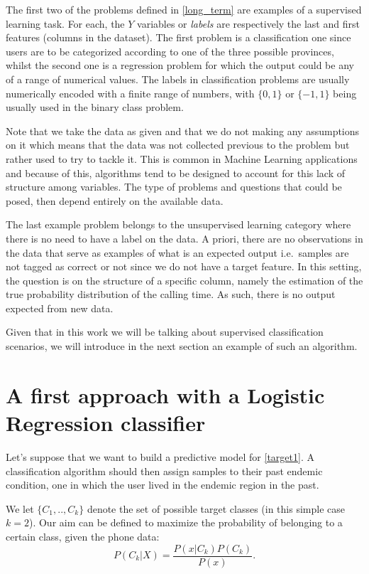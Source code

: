 The first two of the problems defined in \cref{long_term} are examples of a supervised learning task.
For each, the $Y$ variables or \textit{labels} are respectively the last and first features (columns in the dataset).
The first problem is a classification one since users are to be categorized according to one of the three possible provinces, whilst the second one is a regression problem for which the output could be any of a range of numerical values.
The labels in classification problems are usually numerically encoded with a finite range of numbers, with $\{0,1\}$ or $\{-1,1\}$ being usually used in the binary class problem.

Note that we take the data as given and that we do not making any assumptions on it which means that the data was not collected previous to the problem but rather used to try to tackle it.
This is common in Machine Learning applications and because of this, algorithms tend to be designed to account for this lack of structure among variables.
The type of problems and questions that could be posed, then depend entirely on the available data.

The last example problem belongs to the unsupervised learning category where there is no need to have a label on the data.
A priori, there are no observations in the data that serve as examples of what is an expected output i.e.\ samples are not tagged as correct or not since we do not have a target feature.
In this setting, the question is on the structure of a specific column, namely the estimation of the true probability distribution of the calling time.
As such, there is no output expected from new data.

Given that in this work we will be talking about supervised classification scenarios, we will introduce in the next section an example of such an algorithm.

\section{A first approach with a Logistic Regression classifier}\label{section-logisticRegression}

Let's suppose that we want to build a predictive model for \cref{target1}.
A classification algorithm should then assign samples to their past endemic condition, one in which the user lived in the endemic region in the past.

We let $\{C_1,..,C_k\}$ denote the set of possible target classes (in this simple case $k=2$).
Our aim can be defined to maximize the probability of belonging to a certain class, given the phone data:
\begin{equation}
P(C_k| X) = \frac{P(x|C_k)P(C_k)}{P(x)} .
\end{equation}

